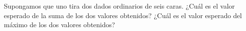 \begin{statement}{8}
  Supongamos que uno tira dos dados ordinarios de seis caras.
  ¿Cu\'al es el valor esperado de la suma de los dos valores obtenidos?
  ¿Cu\'al es el valor esperado del m\'aximo de los dos valores obtenidos?
\end{statement}